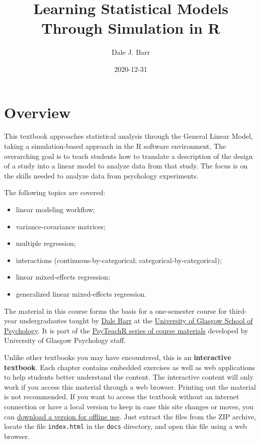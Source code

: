 \documentclass[]{book}
\title{Learning Statistical Models Through Simulation in R}
\author{Dale J. Barr}
\date{2020-12-31}
\providecommand{\tightlist}{%
  \setlength{\itemsep}{0pt}\setlength{\parskip}{0pt}}
\begin{document}
\maketitle

{
\setcounter{tocdepth}{1}
\tableofcontents
}
\hypertarget{overview}{%
\chapter*{Overview}\label{overview}}

This textbook approaches statistical analysis through the General Linear Model, taking a simulation-based approach in the R software environment. The overarching goal is to teach students how to translate a description of the design of a study into a linear model to analyze data from that study. The focus is on the skills needed to analyze data from psychology experiments.

The following topics are covered:

\begin{itemize}
\tightlist
\item
  linear modeling workflow;
\item
  variance-covariance matrices;
\item
  multiple regression;
\item
  interactions (continuous-by-categorical; categorical-by-categorical);
\item
  linear mixed-effects regression;
\item
  generalized linear mixed-effects regression.
\end{itemize}

The material in this course forms the basis for a one-semester course for third-year undergradautes taught by \href{}{Dale Barr} at the \href{}{University of Glasgow School of Psychology}. It is part of the \href{https://psyteachr.github.io}{PsyTeachR series of course materials} developed by University of Glasgow Psychology staff.

Unlike other textbooks you may have encountered, this is an \textbf{interactive textbook}. Each chapter contains embedded exercises as well as web applications to help students better understand the content. The interactive content will only work if you access this material through a web browser. Printing out the material is not recommended. If you want to access the textbook without an internet connection or have a local version to keep in case this site changes or moves, you can \href{offline-textbook.zip}{download a version for offline use}. Just extract the files from the ZIP archive, locate the file \texttt{index.html} in the \texttt{docs} directory, and open this file using a web browser.
\end{document}
